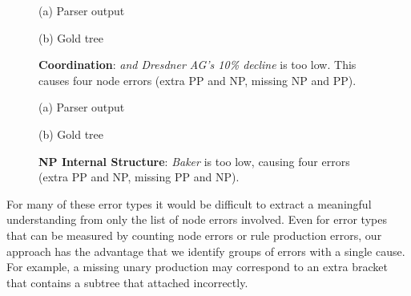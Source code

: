 \begin{figure}
\begin{center}

\small
(a) Parser output

\vspace{3mm}


\small
(b) Gold tree
\end{center}
\derivspace
\caption{
	\label{fig:coordination}
	\textbf{Coordination}: \emph{and Dresdner AG's 10\% decline} is too low.
	This causes four node errors (extra PP and NP, missing NP and PP).
}
\derivaftercompress
\end{figure}

\begin{figure}
\begin{center}

\small
(a) Parser output

\vspace{3mm}


\small
(b) Gold tree
\end{center}
\derivspace
\caption{
	\label{fig:NP-internal-structure}
	\textbf{NP Internal Structure}: \emph{Baker} is too low, causing four
	errors (extra PP and NP, missing PP and NP).
}
\derivaftercompress
\end{figure}

For many of these error types it would be difficult to extract a meaningful
understanding from only the list of node errors involved.  Even for error types
that can be measured by counting node errors or rule production errors, our
approach has the advantage that we identify groups of errors with a single
cause.  For example, a missing unary production may correspond to an extra
bracket that contains a subtree that attached incorrectly.

